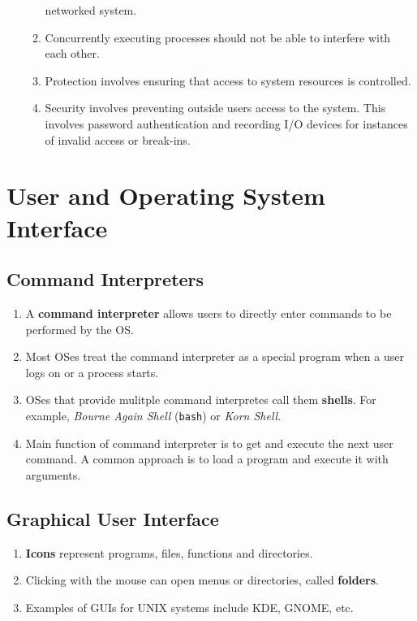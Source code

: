\documentclass[journal,12pt,twocolumn]{IEEEtran}
\begin{document}
\begin{enumerate}
\begin{enumerate}
        networked system.
        \item Concurrently executing processes should not be able to interfere with 
        each other.
        \item Protection involves ensuring that access to system resources is 
        controlled.
        \item Security involves preventing outside users access to the system. This
        involves password authentication and recording I/O devices for instances
        of invalid access or break-ins.
    \end{enumerate}
\end{enumerate}

\section{User and Operating System Interface}
\subsection{Command Interpreters}
\begin{enumerate}
    \item A \textbf{command interpreter} allows users to directly enter commands 
    to be performed by the OS.
    \item Most OSes treat the command interpreter as a special program when a user
    logs on or a process starts.
    \item OSes that provide mulitple command interpretes call them 
    \textbf{shells}. For example, \textit{Bourne Again Shell} (\texttt{bash}) 
    or \textit{Korn Shell}.
    \item Main function of command interpreter is to get and execute the next
    user command. A common approach is to load a program and execute it with
    arguments.
\end{enumerate}

\subsection{Graphical User Interface}
\begin{enumerate}
    \item \textbf{Icons} represent programs, files, functions and directories.
    \item Clicking with the mouse can open menus or directories, called 
    \textbf{folders}.
    \item Examples of GUIs for UNIX systems include KDE, GNOME, etc.
\end{enumerate}
\end{document}
